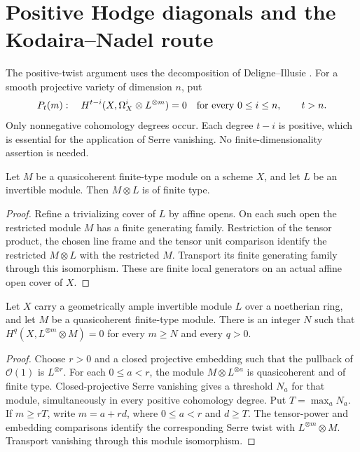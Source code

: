 \section{Positive Hodge diagonals and the Kodaira--Nadel route}

The positive-twist argument uses the decomposition of Deligne--Illusie
\cite{DI87}.  For a smooth projective variety of dimension $n$, put
\[
 P_t(m):\quad H^{t-i}(X,\Omega_X^i\otimes L^{\otimes m})=0
 \quad\hbox{for every }0\leq i\leq n,\qquad t>n.
\]
Only nonnegative cohomology degrees occur.  Each degree $t-i$ is
positive, which is essential for the application of Serre vanishing.
No finite-dimensionality assertion is needed.

\begin{lemma}
\label{lem:kn-line-tensor-finite-type}
\leanok
Let $M$ be a quasicoherent finite-type module on a scheme $X$, and let
$L$ be an invertible module.  Then $M\otimes L$ is of finite type.
\end{lemma}
\begin{proof}
Refine a trivializing cover of $L$ by affine opens.  On each such open
the restricted module $M$ has a finite generating family.
Restriction of the tensor product, the chosen line frame and the
tensor unit comparison identify the restricted $M\otimes L$ with
the restricted $M$.  Transport its finite generating family through
this isomorphism.  These are finite local generators on an actual
affine open cover of $X$.
\end{proof}

\begin{theorem}
\label{thm:kn-coherent-ample-serre}
\leanok
Let $X$ carry a geometrically ample invertible module $L$ over a
noetherian ring, and let $M$ be a quasicoherent finite-type module.
There is an integer $N$ such that
$H^q(X,L^{\otimes m}\otimes M)=0$ for every $m\geq N$ and every $q>0$.
\end{theorem}
\begin{proof}
Choose $r>0$ and a closed projective embedding such that the pullback
of $\mathcal O(1)$ is $L^{\otimes r}$.  For each $0\leq a<r$, the
module $M\otimes L^{\otimes a}$ is quasicoherent and of finite type.
Closed-projective Serre vanishing gives a threshold $N_a$ for that
module, simultaneously in every positive cohomology degree.  Put
$T=\max_a N_a$.  If $m\geq rT$, write $m=a+rd$, where $0\leq a<r$
and $d\geq T$.  The tensor-power and embedding comparisons identify
the corresponding Serre twist with $L^{\otimes m}\otimes M$.
Transport vanishing through this module isomorphism.
\end{proof}

